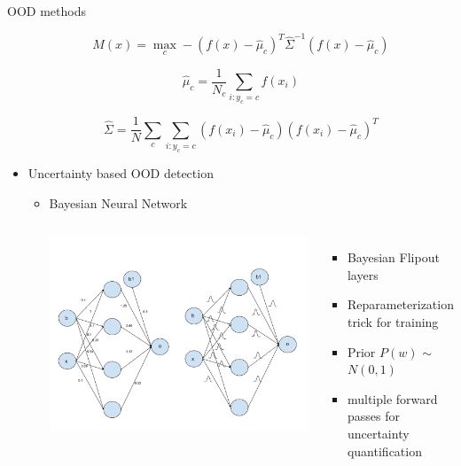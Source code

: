 \documentclass[10pt, aspectratio=169]{beamer}
\begin{document}
\begin{frame}[allowframebreaks]{OOD methods}
\begin{itemize}
        \begin{equation}
            M(x)=\max _{c}-\left(f(x)-\hat{\mu}_{c}\right)^{T} \hat{\Sigma}^{-1}\left(f(x)-\hat{\mu}_{c}\right)
        \end{equation}

        $$\hat{\mu}_{c}=\frac{1}{N_{c}} \sum_{i: y_{c}=c} f\left(x_{i}\right)$$
            
        $$\hat{\Sigma}=\frac{1}{N} \sum_{c} \sum_{i: y_{c}=c}\left(f\left(x_{i}\right)-\hat{\mu}_{c}\right)\left(f\left(x_{i}\right)-\hat{\mu}_{c}\right)^{T} $$ \newline \newline \newline
        
        \item Uncertainty based OOD detection
        \begin{itemize}
            \item Bayesian Neural Network
            \begin{columns}
                   \centering
                   \includegraphics[scale=0.275]{images/BNN.pdf}
                    \begin{itemize}
                        \item Bayesian Flipout layers \citep{Wen2018}
                        \item Reparameterization trick for training \citep{Kingma2015}
                        \item Prior $P(w)$ $\sim$ $N(0, 1)$
                        \item multiple forward passes for uncertainty quantification \newline \newline

\end{itemize}
\end{columns}
\end{itemize}
\end{itemize}
\end{frame}
\end{document}
